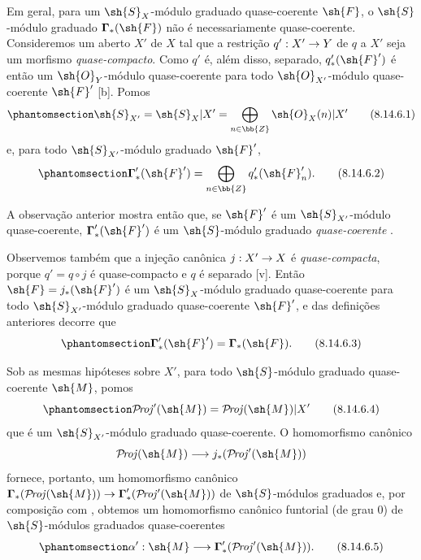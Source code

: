 \documentclass[oneside,10pt]{amsart}
\makeatletter
\newcommand{\ega@arrow}[2]{\mathchoice{#1}{#2}{#2}{#2}}
\renewcommand{\to}{\ega@arrow{\longrightarrow}{\rightarrow}}
\def\shProj{\mathcal{P}\!\mathit{roj}}
\let\EGAOriginalLabel\label
\renewcommand{\label}[1]{\phantomsection\EGAOriginalLabel{#1}}
\makeatother
\begin{document}
\begin{env}[8.14.6]
\label{II.8.14.6}
Em geral, para um $\sh{S}_X$-módulo graduado quase-coerente $\sh{F}$, o $\sh{S}$-módulo graduado $\boldsymbol{\Gamma}_*(\sh{F})$ não é necessariamente quase-coerente.
Consideremos um aberto $X'$ de $X$ tal que a restrição $q':X'\to Y$ de $q$ a $X'$ seja um morfismo \emph{quase-compacto}.
Como $q'$ é, além disso, separado, $q'_*(\sh{F}')$ é então um $\sh{O}_Y$-módulo quase-coerente para todo $\sh{O}_{X'}$-módulo quase-coerente $\sh{F}'$ [b].
Pomos
\[
\label{II.8.14.6.1}
    \sh{S}_{X'} = \sh{S}_X|X' = \bigoplus_{n\in\bb{Z}}\sh{O}_X(n)|X'
\tag{8.14.6.1}
\]
e, para todo $\sh{S}_{X'}$-módulo graduado $\sh{F}'$,
\[
\label{II.8.14.6.2}
    \boldsymbol{\Gamma}'_*(\sh{F}') = \bigoplus_{n\in\bb{Z}}q'_*(\sh{F}'_n).
\tag{8.14.6.2}
\]

A observação anterior mostra então que, se $\sh{F}'$ é um $\sh{S}_{X'}$-módulo quase-coerente, $\boldsymbol{\Gamma}'_*(\sh{F}')$ é um $\sh{S}$-módulo graduado \emph{quase-coerente} .

Observemos também que a injeção canônica $j:X'\to X$ é \emph{quase-compacta}, porque $q'=q\circ j$ é quase-compacto e $q$ é separado [v].
Então $\sh{F}=j_*(\sh{F}')$ é um $\sh{S}_X$-módulo graduado quase-coerente para todo $\sh{S}_{X'}$-módulo graduado quase-coerente $\sh{F}'$, e das definições anteriores decorre que
\[
\label{II.8.14.6.3}
    \boldsymbol{\Gamma}'_*(\sh{F}') = \boldsymbol{\Gamma}_*(\sh{F}).
\tag{8.14.6.3}
\]

Sob as mesmas hipóteses sobre $X'$, para todo $\sh{S}$-módulo graduado quase-coerente $\sh{M}$, pomos
\[
\label{II.8.14.6.4}
    \shProj'(\sh{M}) = \shProj(\sh{M})|X'
\tag{8.14.6.4}
\]
que é um $\sh{S}_{X'}$-módulo graduado quase-coerente.
O homomorfismo canônico
\[
    \shProj(\sh{M}) \to j_*(\shProj'(\sh{M}))
\]
 fornece, portanto, um homomorfismo canônico $\boldsymbol{\Gamma}_*(\shProj(\sh{M}))\to\boldsymbol{\Gamma}'_*(\shProj'(\sh{M}))$ de $\sh{S}$-módulos graduados e, por composição com , obtemos um homomorfismo canônico funtorial (de grau $0$) de $\sh{S}$-módulos graduados quase-coerentes
\[
\label{II.8.14.6.5}
    \alpha': \sh{M} \to \boldsymbol{\Gamma}'_*(\shProj'(\sh{M})).
\tag{8.14.6.5}
\]
\end{env}
\end{document}
